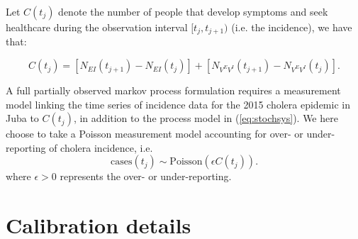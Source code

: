 Let \(C(t_j)\) denote the number of people that develop symptoms and seek healthcare during the
observation interval \([t_j, t_{j+1})\) (i.e. the incidence), we have
that:

\begin{equation}
    C(t_j) = [N_{EI}(t_{j+1}) - N_{EI}(t_j)] + [N_{V^EV^I}(t_{j+1}) - N_{V^EV^I}(t_j)].
\end{equation}

A full partially observed markov process formulation requires a measurement model linking the time series of incidence data for the 2015 cholera epidemic in Juba to \(C(t_j)\), in addition to the process model in (\ref{eq:stochsys}). We here choose to take a Poisson measurement model accounting for over- or under-reporting of cholera incidence, i.e.
\[
	\text{cases}(t_j) \sim \text{Poisson}(\epsilon C(t_j)).
\]
where \(\epsilon > 0\) represents the over- or under-reporting.

\section{Calibration details}

\label{sec:calibration}

